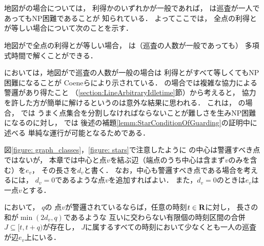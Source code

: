 \chapter{{\graphStar}}
\label{chapter: star}

地図が{\graphStar}の場合については，
利得か{\maxIdletime}のいずれかが一般であれば，
{\PPProfit}は巡査が一人であってもNP困難であることが
知られている\cite[Theorems 5 and 6]{coene2011charlemagne}．
よってここでは，
全点の利得と{\maxIdletime}が等しい場合について次のことを示す．

\begin{theo}
  \label{theo:StarUnaryProfitAndIdletime}
  地図が{\graphStar}で全点の利得と{\maxIdletime}が等しい場合，
  {\PPProfit}は（巡査の人数が一般であっても）
  多項式時間で解くことができる．
\end{theo}

{\independentPP}においては，地図が{\graphStar}で巡査の人数が一般の場合は
利得と{\maxIdletime}がすべて等しくてもNP困難になることが
Coeneらにより示されている\cite[Theorem~10]{coene2011charlemagne}．
{\graphLine}の場合では複雑な協力による警邏があり得たこと
（\ref{section:LineArbitraryIdletime}節）から考えると，
協力を許した方が簡単に解けるというのは意外な結果に思われる．
これは，
{\graphStar}の場合，
{\independentPP}では
うまく点集合を分割しなければならないことが難しさを生みNP困難になるのに対し，
{\PPProfit}では
後述の補題\ref{lemm:StarConditionOfGuarding}の証明中に述べる
単純な運行が可能となるためである．

図\ref{figure: graph_classes}，\ref{figure: stars}で注意したように
{\graphStar}の中心は警邏すべき点ではないが，
本章では中心と点$v$を結ぶ辺（端点のうち中心は含まず$v$のみを含む）を$e_v$，
その長さを$d_v$と書く．
なお，中心も警邏すべき点である場合を考えるには，
$d_v = 0$であるような点$v$を追加すればよい．
また，$d_v = 0$のときは$e_v$は一点$v$とする．

\begin{lemm}
  \label{lemm:StarCostOfVertex}
  {\graphStar}において，
  {\maxIdletime}$q$の
  点$v$が警邏されているならば，任意の時刻$t \in \mathbf R$に対し，
  長さの和が$\min(2d_v, q)$であるような
  互いに交わらない有限個の時刻区間の合併$J \subseteq [t, t + q)$が存在し，
  $J$に属するすべての時刻において少なくとも一人の巡査が辺$e_v$上にいる．
\end{lemm}

